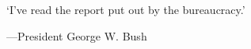 \documentclass[12pt]{article}
\begin{document}
`I've read the report put out by the bureaucracy.'

---President George W. Bush
\end{document}
